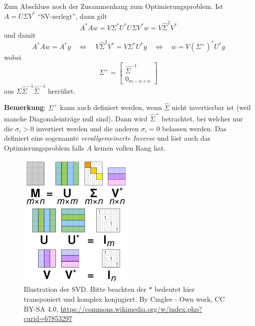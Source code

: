 \documentclass[]{book}
\theoremstyle{definition}
\theoremstyle{definition}
\theoremstyle{definition}
\theoremstyle{definition}
\theoremstyle{remark}
\begin{document}
Zum Abschluss noch der Zusammenhang zum Optimierungsproblem. Ist \(A=U\Sigma V^*\) ``SV-zerlegt'', dann gilt
\begin{equation*}
A^*Aw = V\Sigma^*U^*U\Sigma V^*w = V\hat \Sigma^2 V^* 
\end{equation*}
und damit
\begin{equation*}
A^*Aw = A^*y \quad \Leftrightarrow \quad V\hat \Sigma^2 V^*  = V\Sigma^*U^*y \quad \Leftrightarrow \quad w = V(\Sigma^+)^*U^*y
\end{equation*}
wobei
\begin{equation*}
\Sigma^+ = \begin{bmatrix}
\hat \Sigma^{-1} \\ 0_{m-n \times n}
\end{bmatrix}
\end{equation*}
aus \(\Sigma \hat \Sigma^{-1}\hat \Sigma^{-1}\) herrührt.

\textbf{Bemerkung}: \(\Sigma^+\) kann auch definiert werden, wenn \(\hat \Sigma\) nicht invertierbar ist (weil manche Diagonaleinträge null sind). Dann wird \(\hat \Sigma^+\) betrachtet, bei welcher nur die \(\sigma_i>0\) invertiert werden und die anderen \(\sigma_i=0\) belassen werden. Das definiert eine sogenannte \emph{verallgemeinerte Inverse} und löst auch das Optimierungsproblem falls \(A\) keinen vollen Rang hat.

\begin{figure}
\hypertarget{fig-SVD}{%
\centering
\includegraphics[width=0.5\textwidth,height=\textheight]{bilder/03-412px-Singular_value_decomposition_visualisation.svg.png}
\caption{Illustration der SVD. Bitte beachten der \(*\) bedeutet hier transponiert und komplex konjugiert. By Cmglee - Own work, CC BY-SA 4.0, \url{https://commons.wikimedia.org/w/index.php?curid=67853297}}\label{fig-SVD}
}
\end{figure}
\end{document}
